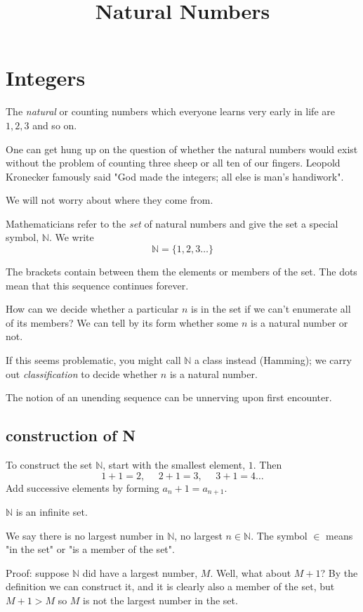 \documentclass[11pt, oneside]{article}
\title{Natural Numbers}
\date{}
\begin{document}
\maketitle
\Large
\section*{Integers}

The \emph{natural} or counting numbers which everyone learns very early in life are $1, 2, 3$ and so on.

One can get hung up on the question of whether the natural numbers would exist without the problem of counting three sheep or all ten of our fingers.  Leopold Kronecker famously said "God made the integers; all else is man's handiwork".

We will not worry about where they come from.

Mathematicians refer to the \emph{set} of natural numbers and give the set a special symbol, $\mathbb{N}$.  We write
\[ \mathbb{N} = \{ 1, 2, 3 \dots \} \]

The brackets contain between them the elements or members of the set. The dots mean that this sequence continues forever.

How can we decide whether a particular $n$ is in the set if we can't enumerate all of its members?  We can tell by its form whether some $n$ is a natural number or not.  

If this seems problematic, you might call $\mathbb{N}$ a class instead (Hamming);  we carry out \emph{classification} to decide whether $n$ is a natural number.

The notion of an unending sequence can be unnerving upon first encounter.

\subsection*{construction of N}

To construct the set $\mathbb{N}$, start with the smallest element, $1$.  Then 
\[ 1 + 1 = 2, \ \ \ \ \ \ 2 + 1 = 3, \ \ \ \ \ \ 3 + 1 = 4 \dots \]
Add successive elements by forming $a_n + 1 = a_{n+1}$.

$\mathbb{N}$ is an infinite set.

We say there is no largest number in $\mathbb{N}$, no largest $n \in \mathbb{N}$.  The symbol $\in$ means "in the set" or "is a member of the set".

Proof:  suppose $\mathbb{N}$ did have a largest number, $M$.  Well, what about $M + 1$?  By the definition we can construct it, and it is clearly also a member of the set, but $M + 1 > M$ so $M$ is not the largest number in the set.
\end{document}
